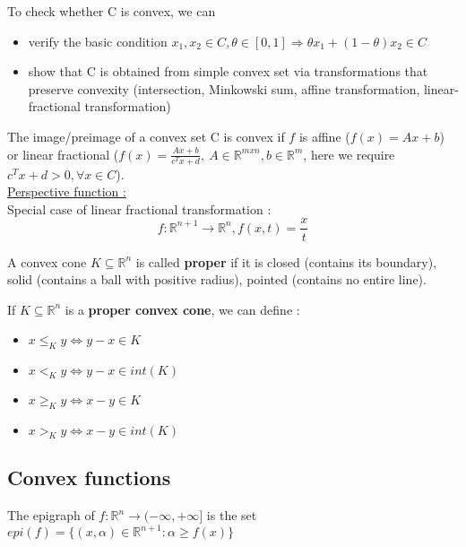 \documentclass[../main.tex]{subfiles}
\begin{document}
To check whether C is convex, we can \begin{itemize}
    \item verify the basic condition $x_1, x_2 \in C, \theta \in [0,1] \Rightarrow \theta x_1 + (1-\theta) x_2 \in C$\\
    \item show that C is obtained from simple convex set via transformations that preserve convexity (intersection, Minkowski sum, affine transformation, linear-fractional transformation)\\
\end{itemize}

The image/preimage of a convex set C is convex if $f$ is affine ($f(x)= Ax+b$) or linear fractional ($f(x) = \frac{Ax+b}{c^Tx +d}, \: A\in \mathbb{R}^{mxn}, b\in \mathbb{R}^m$, here we require $c^T x+d > 0, \forall x\in C$).\\

\quad \underline{Perspective function :}\\
Special case of linear fractional transformation : \begin{equation}
    f : \mathbb{R}^{n+1} \rightarrow \mathbb{R}^n, f(x,t) = \frac{x}{t}
\end{equation}

\begin{theorem}
    A convex cone $K \subseteq \mathbb{R}^n$ is called \textbf{proper} if it is closed (contains its boundary), solid (contains a ball with positive radius), pointed (contains no entire line).
\end{theorem}

If $K \subseteq \mathbb{R}^n$ is a \textbf{proper convex cone}, we can define : \begin{itemize}
    \item $x \leq_K y \Leftrightarrow y-x \in K$
    \item $x <_K y \Leftrightarrow y-x \in int(K)$
    \item $x \geq_K y \Leftrightarrow x-y \in K$
    \item $x >_K y \Leftrightarrow x-y \in int(K)$
\end{itemize}

\subsection{Convex functions}

\begin{theorem}
    The epigraph of $f: \mathbb{R}^n \rightarrow (-\infty, +\infty]$ is the set $epi(f) = \{ (x,\alpha) \in \mathbb{R}^{n+1} : \alpha \geq f(x)\}$
\end{theorem}
\end{document}
